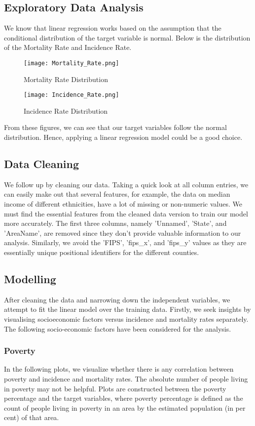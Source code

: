 \documentclass[conference]{IEEEtran}
\begin{document}
\subsection{Exploratory Data Analysis}
We know that linear regression works based on the assumption that the conditional distribution of the target variable is normal. Below is the distribution of the Mortality Rate and Incidence Rate.

\begin{figure}[htbp]
\centerline{\texttt{[image: Mortality\_Rate.png]}}
\caption{Mortality Rate Distribution}
\label{fig}
\end{figure}

\begin{figure}[htbp]
\centerline{\texttt{[image: Incidence\_Rate.png]}}
\caption{Incidence Rate Distribution}
\label{fig}
\end{figure}
From these figures, we can see that our target variables follow the normal distribution. Hence, applying a linear regression model could be a good choice.

\subsection{Data Cleaning}
We follow up by cleaning our data. Taking a quick look at all column entries, we can easily make out that several features, for example, the data on median income of different ethnicities, have a lot of missing or non-numeric values. We must find the essential features from the cleaned data version to train our model more accurately. The first three columns, namely 'Unnamed', 'State', and 'AreaName', are removed since they don't provide valuable information to our analysis. Similarly, we avoid the 'FIPS', 'fips\_x', and 'fips\_y' values as they are essentially unique positional identifiers for the different counties.

\subsection{Modelling}
After cleaning the data and narrowing down the independent variables, we attempt to fit the linear model over the training data. Firstly, we seek insights by visualising socioeconomic factors versus incidence and mortality rates separately. The following socio-economic factors have been considered for the analysis. 

\subsubsection{Poverty}
In the following plots, we visualize whether there is any correlation between poverty and incidence and mortality rates. The absolute number of people living in poverty may not be helpful. Plots are constructed between the poverty percentage and the target variables, where poverty percentage is defined as the count of people living in poverty in an area by the estimated population (in per cent) of that area.
\end{document}
